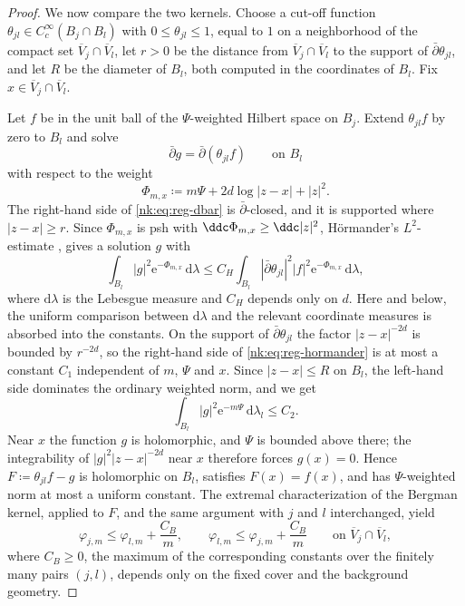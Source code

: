 \begin{proof}
We now compare the two kernels. Choose a cut-off function
$\theta_{jl}\in C^\infty_c(B_j\cap B_l)$ with
$0\le\theta_{jl}\le1$, equal to $1$ on a
neighborhood of the compact set $\overline V_j\cap\overline V_l$, let
$r>0$ be the distance from $\overline V_j\cap\overline V_l$ to the
support of $\bar\partial\theta_{jl}$, and let $R$ be the diameter of
$B_l$, both computed in the coordinates of $B_l$. Fix
$x\in\overline V_j\cap\overline V_l$.
 
Let $f$ be in the unit ball of the $\Psi$-weighted Hilbert space on
$B_j$. Extend $\theta_{jl}f$ by zero to $B_l$ and solve
\begin{equation}\label{nk:eq:reg-dbar}
  \bar\partial g=\bar\partial(\theta_{jl}f)\qquad\text{on }B_l
\end{equation}
with respect to the weight
\[
  \Phi_{m,x}\coloneqq m\Psi+2d\log|z-x|+|z|^2 .
\]
The right-hand side of
\eqref{nk:eq:reg-dbar} is $\bar\partial$-closed, and it is supported where
$|z-x|\ge r$. Since $\Phi_{m,x}$ is psh with
$\ddc\Phi_{m,x}\ge\ddc|z|^2$, H\"ormander's $L^2$-estimate \cite[Chapter~VIII, \S6]{DemCADG}, gives a solution $g$ with
\begin{equation}\label{nk:eq:reg-hormander}
  \int_{B_l}|g|^2\mathrm{e}^{-\Phi_{m,x}}\,\mathrm{d}\lambda
  \le C_H\int_{B_l}|\bar\partial\theta_{jl}|^2|f|^2\mathrm{e}^{-\Phi_{m,x}}\,\mathrm{d}\lambda,
\end{equation}
where $\mathrm{d}\lambda$ is the Lebesgue measure and $C_H$ depends only on
$d$. Here and below, the uniform comparison between $\mathrm{d}\lambda$
and the relevant coordinate measures is absorbed into the constants. On the support of
$\bar\partial\theta_{jl}$ the factor $|z-x|^{-2d}$ is bounded by
$r^{-2d}$, so the right-hand side of \eqref{nk:eq:reg-hormander} is at most
a constant $C_1$ independent of $m$, $\Psi$ and $x$. Since
$|z-x|\le R$ on $B_l$, the left-hand side dominates the ordinary
weighted norm, and we get
\[
  \int_{B_l}|g|^2\mathrm{e}^{-m\Psi}\,\mathrm{d}\lambda_l\le C_2 .
\]
Near $x$ the function $g$ is holomorphic, and $\Psi$ is bounded
above there; the integrability of $|g|^2|z-x|^{-2d}$ near $x$ therefore
forces $g(x)=0$. Hence
$F\coloneqq \theta_{jl}f-g$ is holomorphic on $B_l$, satisfies $F(x)=f(x)$, and
has $\Psi$-weighted norm at most a uniform constant. The extremal
characterization of the Bergman kernel, applied to $F$, and the same
argument with $j$ and $l$ interchanged, yield
\begin{equation}\label{nk:eq:reg-overlap}
  \varphi_{j,m}\le\varphi_{l,m}+\frac{C_B}{m},\qquad
  \varphi_{l,m}\le\varphi_{j,m}+\frac{C_B}{m}
  \qquad\text{on }\overline V_j\cap\overline V_l,
\end{equation}
where $C_B\ge0$, the maximum of the corresponding constants over the
finitely many pairs $(j,l)$, depends only on the fixed cover
and the background geometry.
 

\end{proof}
